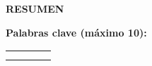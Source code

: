 \newpage
\pagestyle{nonumber}

\begin{center}
    \textbf{
        RESUMEN
    }
    \\[\baselineskip]
\end{center}

\begin{center}
    \setlength{}
\end{center}

\par {
    \textbf{
        Palabras clave (máximo 10):
    }
}

\vspace{0.3cm}
\begin{center}
    \renewcommand{\arraystretch}{1.5}\begin{tabular}{|m{}|m{}|m{}|m{}|}
        \hline
            \centering\arraybackslash{?} & \centering\arraybackslash{?} & \centering\arraybackslash{?} & \centering\arraybackslash{?} \\
        \hline
        \centering\arraybackslash{?} & \centering\arraybackslash{?} & \centering\arraybackslash{?} & \centering\arraybackslash{?} \\
        \hline
        \centering\arraybackslash{?} & \centering\arraybackslash{?} \\
        \cline{1-2}
    \end{tabular}
\end{center}
